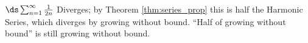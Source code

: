 {$\ds \sum_{n=1}^\infty \frac{1}{2n}$
}
{Diverges; by Theorem \ref{thm:series_prop} this is half the Harmonic Series, which diverges by growing without bound. ``Half of growing without bound'' is still growing without bound.
}